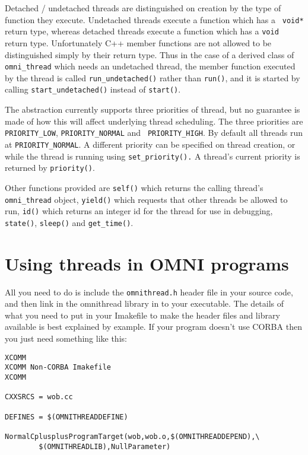\documentclass[11pt]{article}
\begin{document}
Detached / undetached threads are distinguished on creation by the type of
function they execute.  Undetached threads execute a function which has a {\tt
void*} return type, whereas detached threads execute a function which has a
{\tt void} return type.  Unfortunately C++ member functions are not allowed to
be distinguished simply by their return type.  Thus in the case of a derived
class of {\tt omni\_thread} which needs an undetached thread, the member
function executed by the thread is called {\tt run\_undetached()} rather than
{\tt run()}, and it is started by calling {\tt start\_undetached()} instead of
{\tt start()}.

The abstraction currently supports three priorities of thread, but no guarantee
is made of how this will affect underlying thread scheduling.  The three
priorities are {\tt PRIORITY\_LOW}, {\tt PRIORITY\_NORMAL} and {\tt
PRIORITY\_HIGH}.  By default all threads run at {\tt PRIORITY\_NORMAL}.  A
different priority can be specified on thread creation, or while the thread is
running using {\tt set\_priority().}  A thread's current priority is returned
by {\tt priority()}.

Other functions provided are {\tt self()} which returns the calling thread's
{\tt omni\_thread} object, {\tt yield()} which requests that other threads be
allowed to run, {\tt id()} which returns an integer id for the thread for use
in debugging, {\tt state()}, {\tt sleep()} and {\tt get\_time()}.


\section{Using threads in OMNI programs}

All you need to do is include the {\tt omnithread.h} header file in your source
code, and then link in the omnithread library in to your executable.  The
details of what you need to put in your Imakefile to make the header files and
library available is best explained by example.  If your program doesn't use
CORBA then you just need something like this:

\begin{verbatim}
XCOMM
XCOMM Non-CORBA Imakefile
XCOMM

CXXSRCS = wob.cc

DEFINES = $(OMNITHREADDEFINE)

NormalCplusplusProgramTarget(wob,wob.o,$(OMNITHREADDEPEND),\
        $(OMNITHREADLIB),NullParameter)

\end{verbatim}
\end{document}

